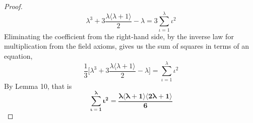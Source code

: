 \documentclass[preview]{standalone}
\begin{document}
\begin{proof}
    \begin{equation*}
        \lambda ^3 
            + 
        3 \frac{ \lambda \big \langle \lambda + 1 \big \rangle }
        {2} 
            - 
        \lambda 
            = 
        3 \sum_{\iota=1}^\lambda \iota ^2
    \end{equation*}
    Eliminating the coefficient  from the right-hand side, 
    by the inverse law for multiplication from the field axioms, 
    gives us the sum of squares in terms of an equation, 
    \begin{equation*}
        \frac{1}{3}
        \bigg[
            \lambda ^3 
                + 
            3 \frac{ \lambda \big \langle \lambda + 1 \big \rangle }
            {2} 
                - 
            \lambda
        \bigg]
            = 
        \sum_{\iota=1}^\lambda \iota ^2
    \end{equation*}
    By Lemma 10, that is
    \begin{equation*}
        \bm{
            \sum_{\iota=1}^\lambda \iota ^2 
                = 
            \frac{ 
                \lambda \big \langle \lambda + 1 \big \rangle
                \big \langle 2 \lambda + 1 \big \rangle 
            }
            {6}
        }
    \end{equation*}
\end{proof}
\end{document}
